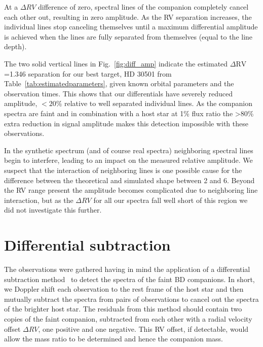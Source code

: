     At a \(\Delta RV\) difference of zero, spectral lines of the companion completely cancel each other out, resulting in zero amplitude. As the RV separation increases, the individual lines stop canceling themselves until a maximum differential amplitude is achieved when the lines are fully separated from themselves (equal to the line depth).

    The two solid vertical lines in Fig.~\ref{fig:diff_amp} indicate the estimated \(\Delta \textrm{RV}\)=1.346\kmps{} separation for our best target, {HD 30501} from Table~\ref{tab:estimatedparameters}, given known orbital parameters and the observation times. This shows that our differentials have severely reduced amplitude, \(<20\%\) relative to well separated individual lines. As the companion spectra are faint and in combination with a host star at 1\% flux ratio the >80\% extra reduction in signal amplitude makes this detection impossible with these observations.

    In the synthetic spectrum (and of course real spectra) neighboring spectral lines begin to interfere, leading to an impact on the measured relative amplitude. We suspect that the interaction of neighboring lines is one possible cause for the difference between the theoretical and simulated shape between 2 and 6\kmps{}. Beyond the RV range present the amplitude becomes complicated due to neighboring line interaction, but as the \(\Delta RV\) for all our spectra fall well short of this region we did not investigate this further.





\section{Differential subtraction}
\label{sec:spec_diff}

The observations were gathered having in mind the application of a differential subtraction method~\citep[e.g.][]{ferluga_separating_1997, kostogryz_spectral_2013} to detect the spectra of the faint BD companions. In short, we Doppler shift each observation to the rest frame of the host star and then mutually subtract the spectra from pairs of observations to cancel out the spectra of the brighter host star. The residuals from this method should contain two copies of the faint companion, subtracted from each other with a radial velocity offset \(\Delta RV\), one positive and one negative. This RV offset, if detectable, would allow the mass ratio to be determined and hence the companion mass.

